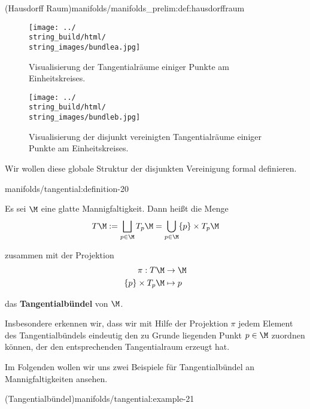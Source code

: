 \documentclass[letterpaper,10pt,english]{jupyterBook}
\begin{document}
\begin{definition}{(Hausdorff Raum)}{manifolds/manifolds_prelim:def:hausdorffraum}
\begin{figure}[htbp]
\centering


\noindent\texttt{[image: ../\\string\_build/html/\\string\_images/bundlea.jpg]}
\caption{Visualisierung der Tangentialräume einiger Punkte am Einheitskreises.}\label{\detokenize{manifolds/tangential:fig-bundlea}}\end{figure}

\begin{figure}[htbp]
\centering


\noindent\texttt{[image: ../\\string\_build/html/\\string\_images/bundleb.jpg]}
\caption{Visualisierung der disjunkt vereinigten Tangentialräume einiger Punkte am Einheitskreises.}\label{\detokenize{manifolds/tangential:fig-bundleb}}\end{figure}

\par
Wir wollen diese globale Struktur der disjunkten Vereinigung formal definieren.
\begin{definition}{}{manifolds/tangential:definition-20}



\par
Es sei \(\M\) eine glatte Mannigfaltigkeit.
Dann heißt die Menge
\begin{align*}
T\M := \bigsqcup_{p\in\M}  T_p\M = \bigcup_{p\in\M} \{p\} \times T_p\M
\end{align*}
\par
zusammen mit der Projektion
\begin{align*}
\pi:T\M &\to \M\\
\{p\}\times T_p\M &\mapsto p
\end{align*}
\par
das \textbf{Tangentialbündel} von \(\M\).
\end{definition}

\par
Insbesondere erkennen wir, dass wir mit Hilfe der Projektion \(\pi\) jedem Element des Tangentialbündels eindeutig den zu Grunde liegenden Punkt \(p\in\M\) zuordnen können, der den entsprechenden Tangentialraum erzeugt hat.

\par
Im Folgenden wollen wir uns zwei Beispiele für Tangentialbündel an Mannigfaltigkeiten ansehen.
\begin{example}{(Tangentialbündel)}{manifolds/tangential:example-21}






\end{example}
\end{definition}
\end{document}
